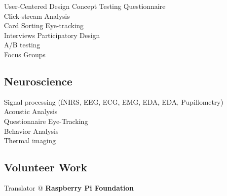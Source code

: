 \documentclass[a4paper]{deedy-resume} %
\begin{document}
\begin{minipage}[t]{0.28\textwidth}
User-Centered Design \textbullet{} Concept Testing \textbullet{}  Questionnaire \\ Click-stream Analysis\\ 
Card Sorting \textbullet{} Eye-tracking \\ Interviews \textbullet{} Participatory Design \\  A/B testing\\
Focus Groups\\
\sectionspace

\subsection{Neuroscience}

Signal processing (fNIRS, EEG, ECG, EMG, EDA, EDA, Pupillometry)\\Acoustic Analysis \\ 
Questionnaire \textbullet{} Eye-Tracking \\ Behavior Analysis  \\
Thermal imaging\\
\sectionspace

\iffalse
\subsection{Personal skills}

Problem solving \textbullet{} Teamwork \\ Project Management \textbullet{} Transform Coffee in Code\textbullet{} Critical Thinking \textbullet{} Creativity \textbullet{} Optimism
\sectionspace
\fi
\subsection{Volunteer Work}
Translator @ \textbf{Raspberry Pi Foundation}

\end{minipage} %
\hfill
%
\begin{minipage}[t]{0.06\textwidth} %
\end{minipage}
\end{document}
